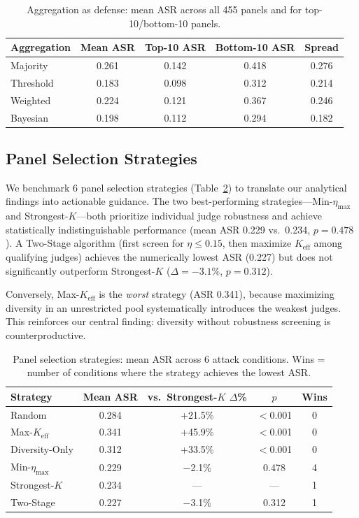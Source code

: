 \documentclass[11pt,a4paper]{article}
\begin{document}
\begin{table}[t]
\centering
\caption{Aggregation as defense: mean ASR across all 455 panels and for top-10/bottom-10 panels.}
\label{tab:agg_defense}
\small
\begin{tabular}{lcccc}
\toprule
\textbf{Aggregation} & \textbf{Mean ASR} & \textbf{Top-10 ASR} & \textbf{Bottom-10 ASR} & \textbf{Spread} \\
\midrule
Majority & 0.261 & 0.142 & 0.418 & 0.276 \\
Threshold & 0.183 & 0.098 & 0.312 & 0.214 \\
Weighted & 0.224 & 0.121 & 0.367 & 0.246 \\
Bayesian & 0.198 & 0.112 & 0.294 & 0.182 \\
\bottomrule
\end{tabular}
\end{table}

\subsection{Panel Selection Strategies}
\label{sec:selection}

We benchmark 6 panel selection strategies (Table~\ref{tab:selection}) to translate our analytical findings into actionable guidance.
The two best-performing strategies---Min-$\eta_{\max}$ and Strongest-$K$---both prioritize individual judge robustness and achieve statistically indistinguishable performance (mean ASR 0.229 vs.\ 0.234, $p = 0.478$).
A Two-Stage algorithm (first screen for $\eta \leq 0.15$, then maximize $K_{\mathrm{eff}}$ among qualifying judges) achieves the numerically lowest ASR (0.227) but does not significantly outperform Strongest-$K$ ($\Delta = -3.1\%$, $p = 0.312$).

Conversely, Max-$K_{\mathrm{eff}}$ is the \emph{worst} strategy (ASR 0.341), because maximizing diversity in an unrestricted pool systematically introduces the weakest judges.
This reinforces our central finding: diversity without robustness screening is counterproductive.

\begin{table}[t]
\centering
\caption{Panel selection strategies: mean ASR across 6 attack conditions. Wins = number of conditions where the strategy achieves the lowest ASR.}
\label{tab:selection}
\small
\begin{tabular}{lcccc}
\toprule
\textbf{Strategy} & \textbf{Mean ASR} & \textbf{vs.\ Strongest-$K$ $\Delta$\%} & $p$ & \textbf{Wins} \\
\midrule
Random & 0.284 & +21.5\% & $<$0.001 & 0 \\
Max-$K_{\mathrm{eff}}$ & 0.341 & +45.9\% & $<$0.001 & 0 \\
Diversity-Only & 0.312 & +33.5\% & $<$0.001 & 0 \\
Min-$\eta_{\max}$ & 0.229 & $-$2.1\% & 0.478 & 4 \\
Strongest-$K$ & 0.234 & --- & --- & 1 \\
Two-Stage & 0.227 & $-$3.1\% & 0.312 & 1 \\
\bottomrule
\end{tabular}
\end{table}
\end{document}
